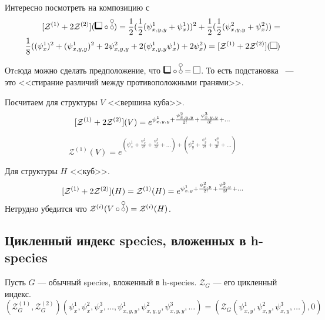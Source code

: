 \begin{example}
Интересно посмотреть на композицию с \dA
\begin{equation}
\begin{split}
\Zfull(\dBB \circ \dA) = \frac{1}{2} (\frac{1}{2}(\psi_{x,y,y}^1 +
\psi_{x}^1))^2 + \frac{1}{2} (\frac{1}{2}(\psi_{x,y,y}^2 +
\psi_{x}^2)) = \\
\frac{1}{8}((\psi_{x}^1)^2 + (\psi_{x, y, y}^1)^2 +
2\psi_{x, y, y}^2 + 2(\psi_{x, y, y}^1\psi_{x}^1) + 2\psi_{x}^2) =
\Zfull(\dAA)
\end{split}
\end{equation}
\begin{remark}
Отcюда можно сделать предположение, что $\dBB \circ \dA = \dAA$.
То есть подстановка \dA~--- это <<стирание различий между противоположными
гранями>>.
\end{remark}
\end{example}
\begin{example}
Посчитаем для структуры $V$ <<вершина куба>>.
$$
[\mathcal Z^{(1)} + 2\mathcal Z^{(2)}](V) = e^{\psi_{x,y,y}^{1} + \frac{\psi_{x,y,y}^{2}}{2!} +
\frac{\psi_{x,y,y}^{3}}{3!} + \dots} 
$$

$$
\mathcal Z^{(1)}(V) = e^{(\psi_{x}^{1} + \frac{\psi_{x}^{2}}{2!} +
\frac{\psi_{x}^{3}}{3!} + \dots) + (\psi_{y}^{2} + \frac{\psi_{y}^{4}}{2!} +
\frac{\psi_{y}^{6}}{3!} + \dots)} 
$$

Для структуры $H$ <<куб>>.
$$
[\mathcal Z^{(1)} + 2\mathcal Z^{(2)}](H) = \mathcal Z^{(1)}(H) = e^{\psi_{x,y}^{1} +
\frac{\psi_{x,y}^{2}}{2!} + \frac{\psi_{x,y}^{3}}{3!} + \dots} 
$$
Нетрудно убедится что $\mathcal Z^{(i)}(V \circ \dA) = \mathcal Z^{(i)}(H)$.
\end{example}

\subsection{Цикленный индекс species, вложенных в h-species}
\begin{statement}
Пусть $G$ --- обычный species, вложенный в h-species. $\mathcal Z_G$ --- его
цикленный индекс.
$$(\mathcal Z^{(1)}_G, \mathcal Z^{(2)}_G)
(\psi_x^1, \psi_x^2, \psi_x^3, \dots, 
\psi_{x,y,y}^1, \psi_{x,y,y}^2, \psi_{x,y,y}^3, \dots)
 = (\mathcal Z_G(\psi_{x,y}^1, \psi_{x,y}^2, \psi_{x,y}^3, \dots), 0)$$
\end{statement}

